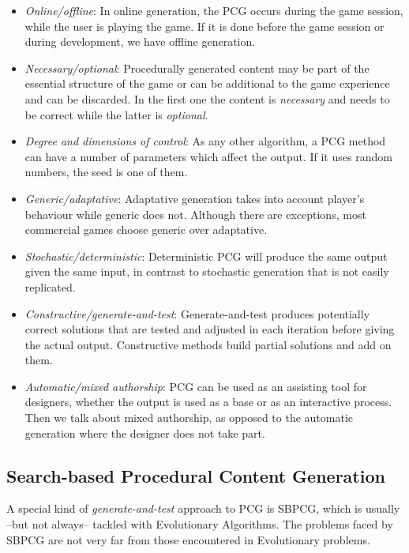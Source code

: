 \begin{itemize}
	\item \textit{Online/offline}: In online generation, the \ac{PCG} occurs during the game session, while the user is playing the game. If it is done before the game session or during development, we have offline generation. 
	\item \textit{Necessary/optional}: Procedurally generated content may be part of the essential structure of the game  or can be additional to the game experience and can be discarded. In the first one the content is \textit{necessary} and needs to be correct while the latter is \textit{optional}.
	\item \textit{Degree and dimensions of control}: As any other algorithm, a \ac{PCG} method can have a number of parameters which affect the output. If it uses random numbers, the seed is one of them.
	\item \textit{Generic/adaptative}: Adaptative generation takes into account player's behaviour while generic does not. Although there are exceptions, most commercial games choose generic over adaptative.
	\item \textit{Stochastic/deterministic}: Deterministic \ac{PCG} will produce the same output given the same input, in contrast to stochastic generation that is not easily replicated.
	\item \textit{Constructive/generate-and-test}: Generate-and-test produces potentially correct solutions that are tested and adjusted in each iteration before giving the actual output. Constructive methods build partial solutions and add on them.
	\item \textit{Automatic/mixed authorship}: \ac{PCG} can be used as an assisting tool for designers, whether the output is used as a base or as an interactive process. Then we talk about mixed authorship, as opposed to the automatic generation where the designer does not take part. 
\end{itemize}

\subsection{Search-based Procedural Content Generation}

A special kind of \textit{generate-and-test} approach to \ac{PCG} is \acf{SBPCG}, which is usually --but not always-- tackled with Evolutionary Algorithms. The problems faced by \ac{SBPCG} are not very far from those encountered in Evolutionary problems. 

